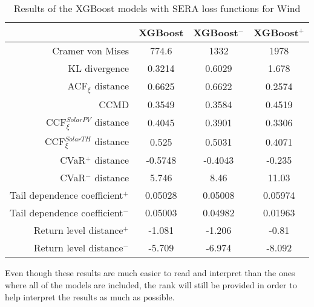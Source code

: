 \newpage
\begin{table}[ht]
    \centering
    \footnotesize
    \begin{tabular}[r]{r|c|cc}
        \toprule
        &XGBoost&XGBoost$^-$&XGBoost$^+$ \\
        \midrule            
        Cramer von Mises&774.6&1332&1978 \\
        KL divergence&0.3214&0.6029&1.678 \\
        ACF$_\xi$ distance&0.6625&0.6622&0.2574 \\
        \midrule
        CCMD&0.3549&0.3584&0.4519 \\
        CCF$_\xi^{Solar PV}$ distance&0.4045&0.3901&0.3306 \\
        CCF$_\xi^{Solar TH}$ distance&0.525&0.5031&0.4071 \\
        \midrule
        CVaR$^+$ distance&-0.5748&-0.4043&-0.235 \\
        CVaR$^-$ distance&5.746&8.46&11.03 \\
        Tail dependence coefficient$^+$&0.05028&0.05008&0.05974 \\
        Tail dependence coefficient$^-$&0.05003&0.04982&0.01963 \\
        Return level distance$^+$&-1.081&-1.206&-0.81 \\
        Return level distance$^-$&-5.709&-6.974&-8.092 \\
        \bottomrule
    \end{tabular}
    \caption{Results of the XGBoost models with SERA loss functions for Wind\label{long}}
    \label{table:results-custom-loss}
\end{table}

Even though these results are much easier to read and interpret than the ones where all of the models are included, the rank will still be provided in order to help interpret the results as much as possible. 

